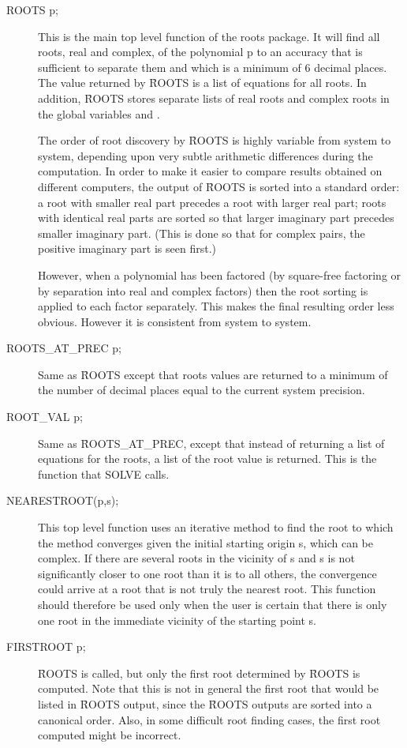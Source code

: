 \begin{description}
\item[ROOTS p;] This is the main top level function of the roots package.
It will find all roots, real and complex, of the polynomial p to an
accuracy that is sufficient to separate them and which is a minimum of 6
decimal places.  The value returned by \f{ROOTS} is a
list of equations for all roots.  In addition, \f{ROOTS} stores separate lists
of real roots and complex roots in the global variables  and
.  
\par
The order of root discovery by \f{ROOTS} is highly variable from system to
system, depending upon very subtle arithmetic differences during the
computation.  In order to make it easier to compare results obtained on
different computers, the output of \f{ROOTS} is sorted into a standard order:
a root with smaller real part precedes a root with larger real part; roots
with identical real parts are sorted so that larger imaginary part
precedes smaller imaginary part. (This is done so that for complex pairs,
the positive imaginary part is seen first.)

However, when a polynomial has been factored (by square-free factoring or
by separation into real and complex factors) then the root sorting is
applied to each factor separately.  This makes the final resulting order
less obvious.  However it is consistent from system to system.

\item[ROOTS\_AT\_PREC p;] Same as \f{ROOTS} except that roots values are
returned to a minimum of the number of decimal places equal to the current
system precision.

\item[ROOT\_VAL p;] Same as \f{ROOTS\_AT\_PREC}, except that instead of
returning a list of equations for the roots, a list of the root value is
returned.  This is the function that SOLVE calls.

\item[NEARESTROOT(p,s);] This top level function uses an iterative method
to find the root to which the method converges given the initial starting
origin s, which can be complex.  If there are several roots in the
vicinity of s and s is not significantly closer to one root than it is to
all others, the convergence could arrive at a root that is not truly the
nearest root.  This function should therefore be used only when the user
is certain that there is only one root in the immediate vicinity of the
starting point s.

\item[FIRSTROOT p;] \f{ROOTS} is called, but only the first root determined by
\f{ROOTS} is computed.  Note that this is not in general the first root that
would be listed in \f{ROOTS} output, since the \f{ROOTS} outputs are sorted into
a canonical order.  Also, in some difficult root finding cases, the first
root computed might be incorrect.
\end{description}


